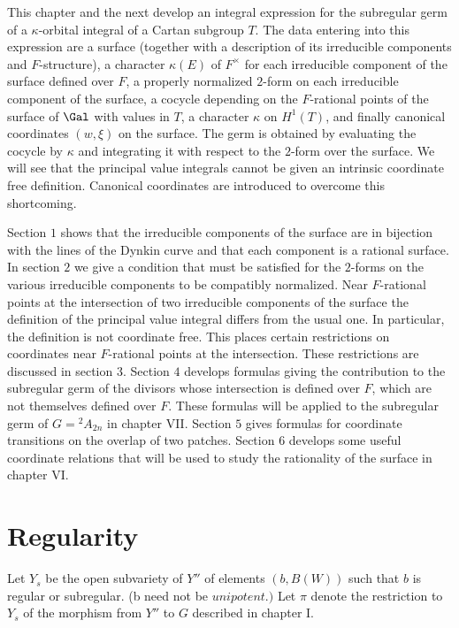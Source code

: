 \documentclass{memo-l}
\theoremstyle{definition}
\theoremstyle{remark}
\numberwithin{section}{chapter}
\numberwithin{equation}{chapter}
\begin{document}
   This chapter and the next develop an integral expression for the
subregular germ of a ${\kappa}$-orbital integral of a Cartan subgroup $T$.
The data entering into this expression are a surface (together with a
description of its irreducible components and $F$-structure), a character
${\kappa}(E)$ of $F^{\times}$ for each irreducible component of the surface
defined over $F$, a properly normalized $2$-form on each irreducible
component of the surface, a cocycle depending on the $F$-rational points of
the surface of $\Gal$ with values in $T$, a character ${\kappa}$
on $H^{1}(T)$, and finally canonical coordinates $(w,{\xi})$ on the
surface.  The germ is obtained by evaluating the cocycle by ${\kappa}$ and
integrating it with respect to the $2$-form over the surface.  We will see
that the principal value integrals cannot be given an intrinsic coordinate
free definition.  Canonical coordinates are introduced to overcome this
shortcoming.

   Section $1$ shows that the irreducible components of the surface are in
bijection with the lines of the Dynkin curve and that each component is a
rational surface.  In section $2$ we give a condition that must be
satisfied for the $2$-forms on the various irreducible components to be
compatibly normalized.  Near $F$-rational points at the intersection of two
irreducible components of the surface the definition of the principal value
integral differs from the usual one.  In particular, the definition is not
coordinate free.  This places certain restrictions on coordinates near
$F$-rational points at the intersection.  These restrictions are discussed
in section $3$.  Section $4$ develops formulas giving the contribution to
the subregular germ of the divisors whose intersection is defined over $F$,
which are not themselves defined over $F$.  These formulas will be applied
to the subregular germ of $G  =  {}^{2}A_{2n}$ in chapter VII.  Section $5$
gives formulas for coordinate transitions on the overlap of two patches.
Section $6$ develops some useful coordinate relations that will be used to
study the rationality of the surface in chapter VI.


\section{Regularity}

   Let $Y_{s}$ be the open subvariety of $Y''$ of elements $(b,B(W))$ such
that $b$ is regular or subregular.  (b need not be $unipotent.)$ Let
${\pi}$ denote the restriction to $Y_{s}$ of the morphism from $Y''$ to $G$
described in chapter I.
\end{document}

